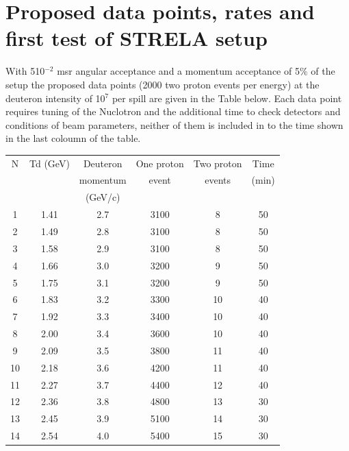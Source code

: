 \documentclass[a4paper,12pt]{article}
\begin{document}
    \section{Proposed data points, rates and first test of  STRELA setup}
    With 510$^{-2}$ msr angular acceptance and a momentum acceptance
    of 5$\%$ of the
    setup the proposed data points (2000 two proton events per energy) at
    the deuteron intensity of 10$^7$ per spill are given in the Table below.
    Each data point requires tuning of the Nuclotron and the additional time to
    check detectors and conditions of beam parameters, neither of them is included
    in to the time shown in the last coloumn of the table.
    \vspace*{5mm}

    \begin{tabular}{|c|c|c|c|c|c|}    \hline
      N    &    Td (GeV)&       Deuteron & One proton & Two proton & Time \\
      & &        momentum  & event  & events  & (min) \\
      & &(GeV/c)&       &       &       \\ \hline
      1   &     1.41 &  2.7  &  3100 &  8  &    50 \\  \hline
      2   &     1.49 &  2.8  &  3100 &  8  &    50 \\  \hline
      3   &     1.58 &  2.9  &  3100 &  8  &    50 \\  \hline
      4   &     1.66 &  3.0  &  3200 &  9  &    50 \\  \hline
      5   &     1.75 &  3.1  &  3200 &  9  &    50 \\  \hline
      6   &     1.83 &  3.2  &  3300 &  10 &    40 \\  \hline
      7   &     1.92 &  3.3 &   3400 &  10 &    40 \\  \hline
      8   &     2.00 &  3.4 &   3600 &  10 &    40 \\  \hline
      9   &     2.09 &  3.5 &   3800 &  11 &    40 \\  \hline
      10  &     2.18 &  3.6 &   4200 &  11 &    40 \\  \hline
      11  &     2.27 &  3.7 &   4400 &  12 &    40 \\  \hline
      12  &     2.36 &  3.8 &   4800 &  13 &    30 \\  \hline
      13  &     2.45 &  3.9 &   5100 &  14 &    30 \\  \hline
      14  &     2.54 &  4.0 &   5400 &  15 &    30 \\  \hline
    \end{tabular}
    \vspace*{5mm}
\end{document}
